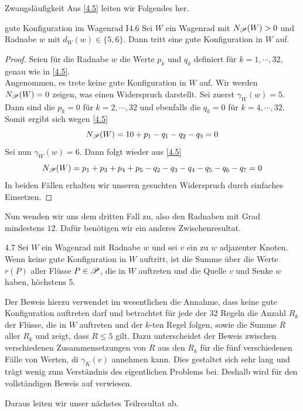 \begin{section}{Zwangsläufigkeit}
  Aus \ref{4.5} leiten wir Folgendes her.

 \begin{satzl}{gute Konfiguration im Wagenrad I}{4.6}
  Sei $W$ ein Wagenrad mit $N_{\mathscr{P}}(W) > 0$ und Radnabe $w$ mit $d_W(w) \in \{5,6\}$. Dann tritt eine gute Konfiguration in $W$ auf.
 \end{satzl}
 
 \begin{proof}
  Seien für die Radnabe $w$ die Werte $p_k$ und $q_k$ definiert für $k = 1,\cdots,32$, genau wie in \ref{4.5}.\\
  Angenommen, es trete keine gute Konfiguration in $W$ auf. Wir werden $N_{\mathscr{P}}(W) = 0$ zeigen, was einen Widerspruch darstellt. Sei zuerst $\gamma_W(w) = 5$. Dann sind die $p_k = 0$ für $k = 2,\cdots,32$ und ebenfalls die $q_k = 0$ für $k = 4,\cdots,32$. Somit ergibt sich wegen \ref{4.5}
  \[ N_{\mathscr{P}}(W) = 10 + p_1 - q_1 - q_2 - q_3 = 0 \]
  Sei nun $\gamma_W(w) = 6$. Dann folgt wieder aus \ref{4.5}
  \[ N_{\mathscr{P}}(W) = p_1 + p_3 + p_4 + p_5 - q_2 - q_3 - q_4 - q_5 - q_6 - q_7 = 0\]
  In beiden Fällen erhalten wir unseren gesuchten Widerspruch durch einfaches Einsetzen.
 \end{proof}
 
 Nun wenden wir uns dem dritten Fall zu, also den Radnaben mit Grad mindestens $12$. Dafür benötigen wir ein anderes Zwischenresultat.
 
 \begin{lemmal}{}{4.7}
  Sei $W$ ein Wagenrad mit Radnabe $w$ und sei $v$ ein zu $w$ adjazenter Knoten. Wenn keine gute Konfiguration in $W$ auftritt, ist die Summe über die Werte $r(P)$ aller Flüsse $P \in \mathscr{P}$, die in $W$ auftreten und die Quelle $v$ und Senke $w$ haben, höchstens 5.
 \end{lemmal}

 Der Beweis hierzu verwendet im wesentlichen die Annahme, dass keine gute Konfiguration auftreten darf und betrachtet für jede der 32 Regeln die Anzahl $R_k$ der Flüsse, die in $W$ auftreten und der $k$-ten Regel folgen, sowie die Summe $R$ aller $R_k$ und zeigt, dass $R \leq 5$ gilt. Dazu unterscheidet der Beweis zwischen verschiedenen Zusammensetzungen von $R$ aus den $R_k$ für die fünf verschiedenen Fälle von Werten, di $\gamma_K(v)$ annehmen kann. Dies gestaltet sich sehr lang und trägt wenig zum Verständnis des eigentlichen Problems bei. Deshalb wird für den vollständigen Beweis auf \cite[Seite 21, Lemma 4.7]{FourRSST} verwiesen.
 
 Daraus leiten wir unser nächstes Teilresultat ab.
 

\end{section}
